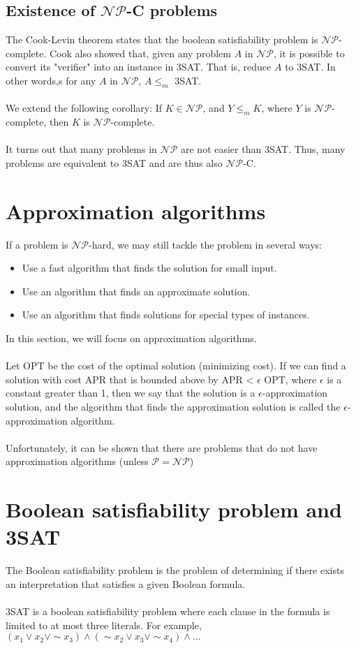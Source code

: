 \documentclass[a4paper]{article}
\begin{document}
\subsection{Existence of $\mathcal{NP}$-C problems}
The Cook-Levin theorem states that the boolean satisfiability problem is $\mathcal{NP}$-complete. Cook also showed that, given any problem $A$ in $\mathcal{NP}$, it is possible to convert its "verifier" into an instance in 3SAT. That is, reduce $A$ to 3SAT. In other words,s for any $A$ in $\mathcal{NP}$, $A \le_m$ 3SAT.\\\\
We extend the following corollary: If $K\in \mathcal{NP}$, and $Y\le_m K$, where $Y$ is $\mathcal{NP}$-complete, then $K$ is $\mathcal{NP}$-complete.\\\\
It turns out that many problems in $\mathcal{NP}$ are not easier than 3SAT. Thus, many problems are equivalent to 3SAT and are thus also $\mathcal{NP}$-C.

\section{Approximation algorithms}
If a problem is $\mathcal{NP}$-hard, we may still tackle the problem in several ways:
\begin{itemize}
	\itemsep0em
	\item Use a fast algorithm that finds the solution for small input.
	\item Use an algorithm that finds an approximate solution.
	\item Use an algorithm that finds solutions for special types of instances.
\end{itemize}
In this section, we will focus on approximation algorithms.\\\\
Let OPT be the cost of the optimal solution (minimizing cost). If we can find a solution with cost APR that is bounded above by APR < $\epsilon$ OPT, where $\epsilon$ is a constant greater than 1, then we say that the solution is a $\epsilon$-approximation solution, and the algorithm that finds the approximation solution is called the $\epsilon$-approximation algorithm.\\\\
Unfortunately, it can be shown that there are problems that do not have approximation algorithms (unless $\mathcal{P} = \mathcal{NP}$)

\appendix
\section{Boolean satisfiability problem and 3SAT}
The Boolean satisfiability problem is the problem of determining if there exists an interpretation that satisfies a given Boolean formula.\\\\
3SAT is a boolean satisfiability problem where each clause in the formula is limited to at most three literals. For example, $(x_1 \lor x_2 \lor \sim x_3) \land (\sim x_2 \lor x_3 \lor \sim x_4) \land \dots$
\end{document}
